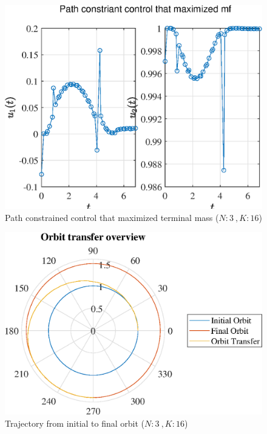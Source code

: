 \documentclass[]{article}
\begin{document}
	\begin{figure}
		\centering
		\includegraphics[scale=0.75]{path_N3_K16_C3_mf.eps}
		\caption{Path constrained control that maximized terminal mass (\(N:3\ , K:16\))}
		\label{fig:path_N3_K16_C3_mf}
	\end{figure}
	\begin{figure}
		\centering
		\includegraphics[scale=0.75]{orbit_N3_K16_C3_mf.eps}
		\caption{Trajectory from initial to final orbit (\(N:3\ , K:16\))}
		\label{fig:orbit_N3_K16_C3_mf}
	\end{figure}
\end{document}
